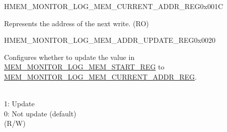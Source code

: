 \begin{register}{H}{MEM\_MONITOR\_LOG\_MEM\_CURRENT\_ADDR\_REG}{0x001C}\label{regdesc:MEMMONITORLOGMEMCURRENTADDRREG}
%
\regnewline%
\begin{regdesc}\begin{reglist}
\label{fielddesc:MEMMONITORLOGMEMCURRENTADDR}\item [MEM\_MONITOR\_LOG\_MEM\_CURRENT\_ADDR] Represents the address of the next write. (RO)
\end{reglist}\end{regdesc}
\end{register}

\begin{register}{H}{MEM\_MONITOR\_LOG\_MEM\_ADDR\_UPDATE\_REG}{0x0020}\label{regdesc:MEMMONITORLOGMEMADDRUPDATEREG}
%
%
\regnewline%
\begin{regdesc}\begin{reglist}
\label{fielddesc:MEMMONITORCLRLOGMEMADDRUPDATE}\item [MEM\_MONITOR\_LOG\_MEM\_ADDR\_UPDATE] Configures whether to update the value in \hyperref[fielddesc:MEMMONITORLOGMEMSTART]{MEM\_MONITOR\_LOG\_MEM\_START\_REG} to \hyperref[fielddesc:MEMMONITORLOGMEMCURRENTADDR]{MEM\_MONITOR\_LOG\_MEM\_CURRENT\_ADDR\_REG}.\raggedright \\
1: Update \\
0: Not update (default) \\
(R/W)
\end{reglist}\end{regdesc}
\end{register}

